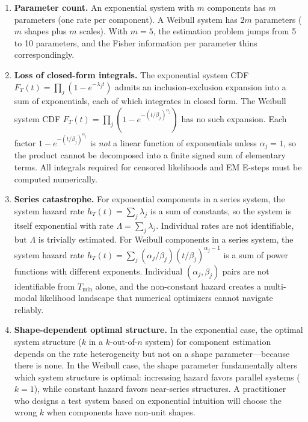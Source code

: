 \documentclass[12pt]{article}
\theoremstyle{definition}
\theoremstyle{remark}
\begin{document}
\begin{enumerate}
\item \textbf{Parameter count.}
  An exponential system with $m$ components has $m$ parameters
  (one rate per component).  A Weibull system has $2m$ parameters
  ($m$ shapes plus $m$ scales).  With $m = 5$, the estimation
  problem jumps from 5 to 10 parameters, and the Fisher information
  per parameter thins correspondingly.

\item \textbf{Loss of closed-form integrals.}
  The exponential system CDF
  $F_T(t) = \prod_j (1 - e^{-\lambda_j t})$ admits an
  inclusion-exclusion expansion into a sum of exponentials, each of
  which integrates in closed form.  The Weibull system CDF
  $F_T(t) = \prod_j (1 - e^{-(t/\beta_j)^{\alpha_j}})$
  has no such expansion.  Each factor
  $1 - e^{-(t/\beta_j)^{\alpha_j}}$ is \emph{not} a linear
  function of exponentials unless $\alpha_j = 1$, so
  the product cannot be decomposed into a finite signed sum of
  elementary terms.  All integrals required for censored
  likelihoods and EM E-steps must be computed numerically.

\item \textbf{Series catastrophe.}
  For exponential components in a series system, the system hazard
  rate $h_T(t) = \sum_j \lambda_j$ is a sum of constants, so the
  system is itself exponential with rate $\Lambda = \sum_j \lambda_j$.
  Individual rates are not identifiable, but $\Lambda$ is trivially
  estimated.  For Weibull components in a series system, the system
  hazard rate $h_T(t) = \sum_j (\alpha_j / \beta_j)(t/\beta_j)^{\alpha_j - 1}$
  is a sum of power functions with different exponents.  Individual
  $(\alpha_j, \beta_j)$ pairs are not identifiable from $T_{\min}$
  alone, and the non-constant hazard creates a multi-modal
  likelihood landscape that numerical optimizers cannot navigate
  reliably.

\item \textbf{Shape-dependent optimal structure.}
  In the exponential case, the optimal system structure ($k$ in a
  $k$-out-of-$n$ system) for component estimation depends on the
  rate heterogeneity but not on a shape parameter---because there
  is none.  In the Weibull case, the shape parameter fundamentally
  alters which system structure is optimal: increasing hazard favors
  parallel systems ($k = 1$), while constant hazard favors
  near-series structures.  A practitioner who designs a test system
  based on exponential intuition will choose the wrong $k$ when
  components have non-unit shapes.
\end{enumerate}
\end{document}
